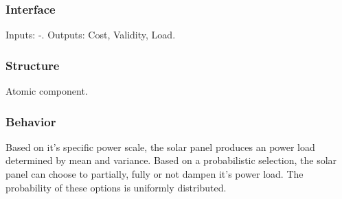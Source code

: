 \subsubsection{Interface}

Inputs: -. Outputs: Cost, Validity, Load.

\subsubsection{Structure}

Atomic component.

\subsubsection{Behavior}

Based on it's specific power scale, the solar panel produces an power load determined by mean and variance. Based on a probabilistic selection, the solar panel can choose to partially, fully or not dampen it's power load. The probability of these options is uniformly distributed.

